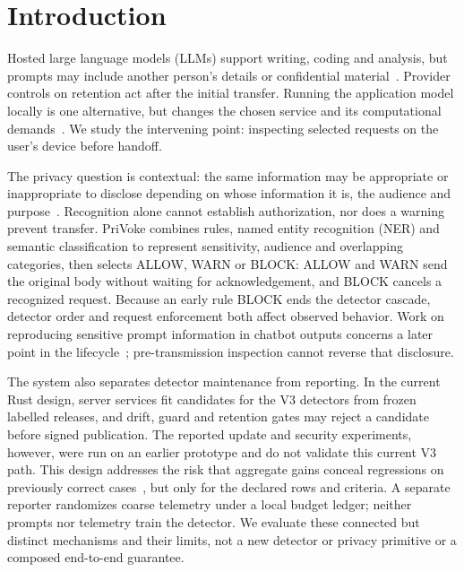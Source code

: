 \documentclass[sigconf]{acmart}
\theoremstyle{acmdefinition}\newtheorem{property}{Property}
\begin{document}
\maketitle

\section{Introduction}
\label{sec:introduction}
Hosted large language models (LLMs) support writing, coding and analysis, but prompts may include another person's details or confidential material~\cite{Gupta2024,LIANG2025101366,koraag2025comparing,SamsungBans2023,GoogleWarns2023}. Provider controls on retention act after the initial transfer. Running the application model locally is one alternative, but changes the chosen service and its computational demands~\cite{Llama2023}. We study the intervening point: inspecting selected requests on the user's device before handoff.

The privacy question is contextual: the same information may be appropriate or inappropriate to disclose depending on whose information it is, the audience and purpose~\cite{NissenbaumContextualIntegrity2004}. Recognition alone cannot establish authorization, nor does a warning prevent transfer. PriVoke combines rules, named entity recognition (NER) and semantic classification to represent sensitivity, audience and overlapping categories, then selects ALLOW, WARN or BLOCK: ALLOW and WARN send the original body without waiting for acknowledgement, and BLOCK cancels a recognized request. Because an early rule BLOCK ends the detector cascade, detector order and request enforcement both affect observed behavior. Work on reproducing sensitive prompt information in chatbot outputs concerns a later point in the lifecycle~\cite{priyanshu2023chatbots}; pre-transmission inspection cannot reverse that disclosure.

The system also separates detector maintenance from reporting. In the current Rust design, server services fit candidates for the V3 detectors from frozen labelled releases, and drift, guard and retention gates may reject a candidate before signed publication. The reported update and security experiments, however, were run on an earlier prototype and do not validate this current V3 path. This design addresses the risk that aggregate gains conceal regressions on previously correct cases~\cite{YanPositiveCongruent2021}, but only for the declared rows and criteria. A separate reporter randomizes coarse telemetry under a local budget ledger; neither prompts nor telemetry train the detector. We evaluate these connected but distinct mechanisms and their limits, not a new detector or privacy primitive or a composed end-to-end guarantee.
\end{document}
